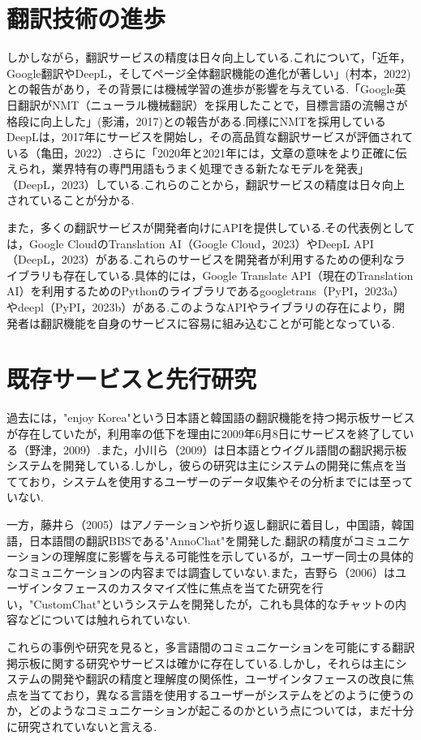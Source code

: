 \documentclass[b5paper,12pt]{jsreport}
\begin{document}
\section{翻訳技術の進歩}

しかしながら，翻訳サービスの精度は日々向上している.これについて，「近年，Google翻訳やDeepL，そしてページ全体翻訳機能の進化が著しい」(村本，2022)との報告があり，その背景には機械学習の進歩が影響を与えている.「Google英日翻訳がNMT（ニューラル機械翻訳）を採用したことで，目標言語の流暢さが格段に向上した」(影浦，2017)との報告がある.同様にNMTを採用しているDeepLは，2017年にサービスを開始し，その高品質な翻訳サービスが評価されている（亀田，2022）.さらに「2020年と2021年には，文章の意味をより正確に伝えられ，業界特有の専門用語もうまく処理できる新たなモデルを発表」（DeepL，2023）している.これらのことから，翻訳サービスの精度は日々向上されていることが分かる.

また，多くの翻訳サービスが開発者向けにAPIを提供している.その代表例としては，Google CloudのTranslation AI（Google Cloud，2023）やDeepL API（DeepL，2023）がある.これらのサービスを開発者が利用するための便利なライブラリも存在している.具体的には，Google Translate API（現在のTranslation AI）を利用するためのPythonのライブラリであるgoogletrans（PyPI，2023a）やdeepl（PyPI，2023b）がある.このようなAPIやライブラリの存在により，開発者は翻訳機能を自身のサービスに容易に組み込むことが可能となっている.

\section{既存サービスと先行研究}

過去には，"enjoy Korea"という日本語と韓国語の翻訳機能を持つ掲示板サービスが存在していたが，利用率の低下を理由に2009年6月8日にサービスを終了している（野津，2009）.また，小川ら（2009）は日本語とウイグル語間の翻訳掲示板システムを開発している.しかし，彼らの研究は主にシステムの開発に焦点を当てており，システムを使用するユーザーのデータ収集やその分析までには至っていない.

一方，藤井ら（2005）はアノテーションや折り返し翻訳に着目し，中国語，韓国語，日本語間の翻訳BBSである"AnnoChat"を開発した.翻訳の精度がコミュニケーションの理解度に影響を与える可能性を示しているが，ユーザー同士の具体的なコミュニケーションの内容までは調査していない.また，吉野ら（2006）はユーザインタフェースのカスタマイズ性に焦点を当てた研究を行い，"CustomChat"というシステムを開発したが，これも具体的なチャットの内容などについては触れられていない.

これらの事例や研究を見ると，多言語間のコミュニケーションを可能にする翻訳掲示板に関する研究やサービスは確かに存在している.しかし，それらは主にシステムの開発や翻訳の精度と理解度の関係性，ユーザインタフェースの改良に焦点を当てており，異なる言語を使用するユーザーがシステムをどのように使うのか，どのようなコミュニケーションが起こるのかという点については，まだ十分に研究されていないと言える.
\end{document}
